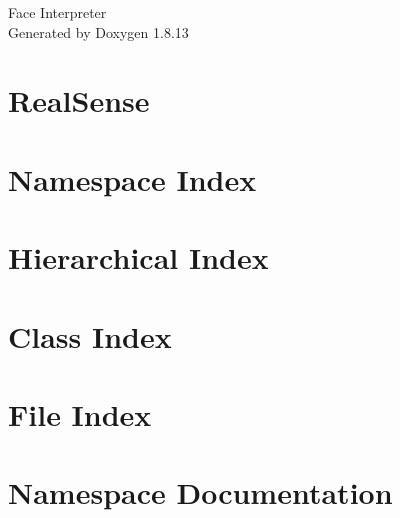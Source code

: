 \documentclass[twoside]{book}
\newcommand{\+}{\discretionary{\mbox{\scriptsize$\hookleftarrow$}}{}{}}
\newcommand{\clearemptydoublepage}{%
  \newpage{\pagestyle{empty}\cleardoublepage}%
}
\begin{document}
\hypersetup{pageanchor=false,
             bookmarksnumbered=true,
             pdfencoding=unicode
            }
\begin{titlepage}
\vspace*{7cm}
\begin{center}%
{\Large Face Interpreter }\\
\vspace*{1cm}
{\large Generated by Doxygen 1.8.13}\\
\end{center}
\end{titlepage}
\clearemptydoublepage
{}
\tableofcontents
\clearemptydoublepage
{}
\hypersetup{pageanchor=true}

\chapter{Real\+Sense}
\label{md__r_e_a_d_m_e}

\chapter{Namespace Index}

\chapter{Hierarchical Index}

\chapter{Class Index}

\chapter{File Index}

\chapter{Namespace Documentation}



\end{document}
